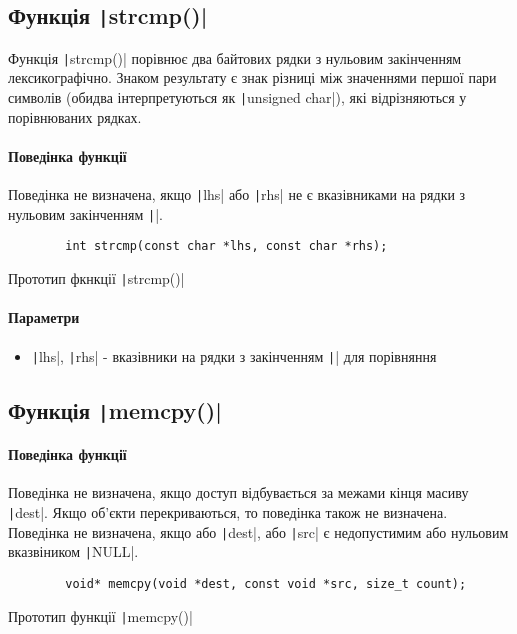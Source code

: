 \subsection[Функція \code{strcmp()}]{Функція \texttt|strcmp()|}
Функція \texttt|strcmp()| порівнює два байтових рядки з нульовим закінченням лексикографічно.
Знаком результату є знак різниці між значеннями першої пари символів (обидва інтерпретуються як \texttt|unsigned char|), які відрізняються у порівнюваних рядках.
\paragraph{Поведінка функції}
Поведінка не визначена, якщо \texttt|lhs| або \texttt|rhs| не є вказівниками на рядки з нульовим закінченням \texttt|\0|.
\begin{listing}[H]
	\begin{verbatim}
		int strcmp(const char *lhs, const char *rhs);
	\end{verbatim}
	\caption[Прототип ]{Прототип фкнкції \texttt|strcmp()|}
	\label{lst:f:strcmp}
\end{listing}
\paragraph{Параметри}
\begin{itemize}
	\item \texttt|lhs|, \texttt|rhs| - вказівники на рядки з закінченням \texttt|\0| для порівняння
\end{itemize}

\subsection[Функція \code{memcpy()}]{Функція \texttt|memcpy()|}
\paragraph{Поведінка функції}
Поведінка не визначена, якщо доступ відбувається за межами кінця масиву \texttt|dest|. Якщо об'єкти перекриваються, то поведінка також не визначена. Поведінка не визначена, якщо або \texttt|dest|, або \texttt|src| є недопустимим або нульовим вказвіником \texttt|NULL|.
\begin{listing}[H]
	\begin{verbatim}
		void* memcpy(void *dest, const void *src, size_t count);
	\end{verbatim}
	\caption[Прототип ]{Прототип функції \texttt|memcpy()|}
	\label{lst:f:memcpy}
\end{listing}

